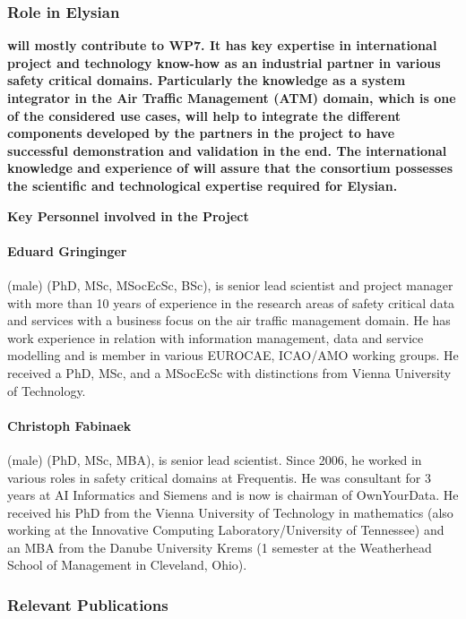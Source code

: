 \documentclass[a4paper,11pt]{article}
\begin{document}
\subsubsection*{Role in Elysian}
\textbf{\FRQshort{} will mostly contribute to WP7. It has key expertise in international project and technology know-how as an industrial partner in various safety critical domains. Particularly the knowledge as a system integrator in the Air Traffic Management (ATM) domain, which is one of the considered use cases, will help to integrate the different components developed by the partners in the project to have successful demonstration and validation in the end. The international knowledge and experience of 
\FRQshort{} will assure that the consortium possesses the scientific and technological expertise required for Elysian.}

\vspace{10pt}

\textbf{Key Personnel involved in the Project}

\paragraph{Eduard Gringinger} (male) (PhD, MSc, MSocEcSc, BSc), is senior lead scientist and project manager with more than 10 years of experience in the research areas of safety critical data and services with a business focus on the air traffic management domain. He has work experience in relation with information management, data and service modelling and is member in various EUROCAE, ICAO/AMO working groups. He received a PhD, MSc, and a MSocEcSc with distinctions from Vienna University of Technology.

\paragraph{Christoph Fabinaek} (male) (PhD, MSc, MBA), is senior lead scientist. Since 2006, he worked in various roles in safety critical domains at Frequentis. He was consultant for 3 years at AI Informatics and Siemens and is now is chairman of OwnYourData. He received his PhD from the Vienna University of Technology in mathematics (also working at the Innovative Computing Laboratory/University of Tennessee) and an MBA from the Danube University Krems (1 semester at the Weatherhead School of Management in Cleveland, Ohio).

\subsubsection*{Relevant Publications}
\end{document}
